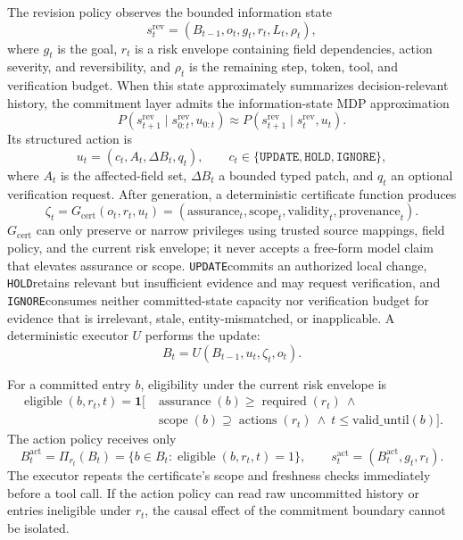 \documentclass{article}
\newcommand{\update}{\texttt{UPDATE}}
\newcommand{\hold}{\texttt{HOLD}}
\newcommand{\ignore}{\texttt{IGNORE}}
\newcommand{\eligible}{\operatorname{eligible}}
\newcommand{\actions}{\operatorname{actions}}
\newcommand{\required}{\operatorname{required}}
\newcommand{\scope}{\operatorname{scope}}
\newcommand{\assurance}{\operatorname{assurance}}
\begin{document}
The revision policy observes the bounded information state
\begin{equation}
s_t^{\mathrm{rev}}=(B_{t-1},o_t,g_t,r_t,L_t,\rho_t),
\end{equation}
where $g_t$ is the goal, $r_t$ is a risk envelope containing field dependencies, action severity, and reversibility, and $\rho_t$ is the remaining step, token, tool, and verification budget. When this state approximately summarizes decision-relevant history, the commitment layer admits the information-state MDP approximation
\begin{equation}
P(s_{t+1}^{\mathrm{rev}}\mid s_{0:t}^{\mathrm{rev}},u_{0:t})
\approx P(s_{t+1}^{\mathrm{rev}}\mid s_t^{\mathrm{rev}},u_t).
\end{equation}
Its structured action is
\begin{equation}
u_t=(c_t,A_t,\Delta B_t,q_t),\qquad
c_t\in\{\update,\hold,\ignore\},
\end{equation}
where $A_t$ is the affected-field set, $\Delta B_t$ a bounded typed patch, and $q_t$ an optional verification request. After generation, a deterministic certificate function produces
\begin{equation}
\zeta_t=G_{\mathrm{cert}}(o_t,r_t,u_t)
=(\mathrm{assurance}_t,\mathrm{scope}_t,\mathrm{validity}_t,\mathrm{provenance}_t).
\end{equation}
$G_{\mathrm{cert}}$ can only preserve or narrow privileges using trusted source mappings, field policy, and the current risk envelope; it never accepts a free-form model claim that elevates assurance or scope. \update commits an authorized local change, \hold retains relevant but insufficient evidence and may request verification, and \ignore consumes neither committed-state capacity nor verification budget for evidence that is irrelevant, stale, entity-mismatched, or inapplicable. A deterministic executor $U$ performs the update:
\begin{equation}
B_t=U(B_{t-1},u_t,\zeta_t,o_t).
\end{equation}

For a committed entry $b$, eligibility under the current risk envelope is
\begin{align}
\eligible(b,r_t,t)=\mathbf{1}[&\assurance(b)\geq\required(r_t)\ \land \nonumber\\
&\scope(b)\supseteq\actions(r_t)\ \land\ t\leq\mathrm{valid\_until}(b)].
\end{align}
The action policy receives only
\begin{equation}
B_t^{\mathrm{act}}=\Pi_{r_t}(B_t)
=\{b\in B_t:\eligible(b,r_t,t)=1\},\qquad
s_t^{\mathrm{act}}=(B_t^{\mathrm{act}},g_t,r_t).
\label{eq:risk-projection}
\end{equation}
The executor repeats the certificate's scope and freshness checks immediately before a tool call. If the action policy can read raw uncommitted history or entries ineligible under $r_t$, the causal effect of the commitment boundary cannot be isolated.
\end{document}
